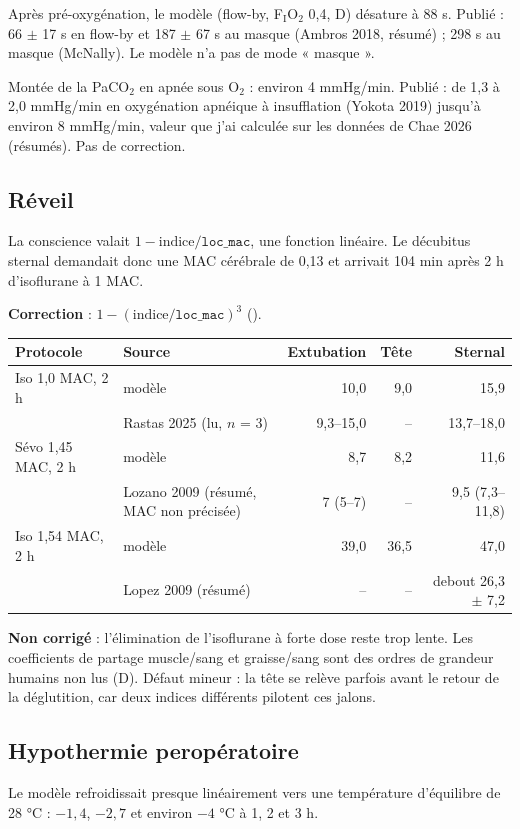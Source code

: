 \documentclass[10pt,a4paper]{article}
\newcommand{\vp}[1]{\path{#1}}
\begin{document}
Après pré-oxygénation, le modèle (flow-by, F$_\mathrm{I}$O$_2$ 0,4, D) désature à 88 s. Publié : 66 $\pm$ 17 s en flow-by et 187 $\pm$ 67 s au masque (Ambros 2018, résumé) ; 298 s au masque (McNally). Le modèle n'a pas de mode « masque ».

Montée de la PaCO$_2$ en apnée sous O$_2$ : environ 4 mmHg/min. Publié : de 1,3 à 2,0 mmHg/min en oxygénation apnéique à insufflation (Yokota 2019) jusqu'à environ 8 mmHg/min, valeur que j'ai calculée sur les données de Chae 2026 (résumés). Pas de correction.

\subsection{Réveil}
La conscience valait $1-\text{indice}/\texttt{loc\_mac}$, une fonction linéaire. Le décubitus sternal demandait donc une MAC cérébrale de 0,13 et arrivait 104 min après 2 h d'isoflurane à 1 MAC.

\textbf{Correction} : $1-(\text{indice}/\texttt{loc\_mac})^3$ (\vp{awareness_hill}).

\begin{center}\small
\begin{tabular}{llrrr}
\toprule
Protocole & Source & Extubation & Tête & Sternal\\
\midrule
Iso 1,0 MAC, 2 h & modèle & 10,0 & 9,0 & 15,9\\
& Rastas 2025 (lu, $n$ = 3) & 9,3–15,0 & -- & 13,7–18,0\\
Sévo 1,45 MAC, 2 h & modèle & 8,7 & 8,2 & 11,6\\
& Lozano 2009 (résumé, MAC non précisée) & 7 (5–7) & -- & 9,5 (7,3–11,8)\\
Iso 1,54 MAC, 2 h & modèle & 39,0 & 36,5 & 47,0\\
& Lopez 2009 (résumé) & -- & -- & debout 26,3 $\pm$ 7,2\\
\bottomrule
\end{tabular}
\end{center}

\textbf{Non corrigé} : l'élimination de l'isoflurane à forte dose reste trop lente. Les coefficients de partage muscle/sang et graisse/sang sont des ordres de grandeur humains non lus (D). Défaut mineur : la tête se relève parfois avant le retour de la déglutition, car deux indices différents pilotent ces jalons.

\subsection{Hypothermie peropératoire}
Le modèle refroidissait presque linéairement vers une température d'équilibre de 28 °C : $-1{,}4$, $-2{,}7$ et environ $-4$ °C à 1, 2 et 3 h.
\end{document}
